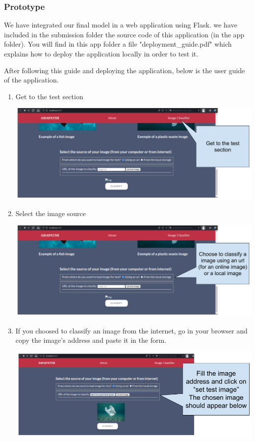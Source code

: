 \documentclass[a4paper, 12pt]{report}
\begin{document}
\subsubsection{Prototype}

We have integrated our final model in a web application using Flask. we have included in the submission folder the source code of this application (in the app folder). You will find in this app folder a file "deployment\_guide.pdf" which explains how to deploy the application locally in order to test it.

After following this guide and deploying the application, below is the user guide of the application.

\begin{enumerate}

    \item Get to the test section

    \includegraphics[height = 0.40 \linewidth]{ill_1.png}

    \item Select the image source

    \includegraphics[height = 0.40 \linewidth]{ill_2.png}

    \item If you choosed to classify an image from the internet, go in your browser and copy the image's  address and paste it in the form.

    \includegraphics[height = 0.42 \linewidth]{ill_3.png}


\end{enumerate}
\end{document}
